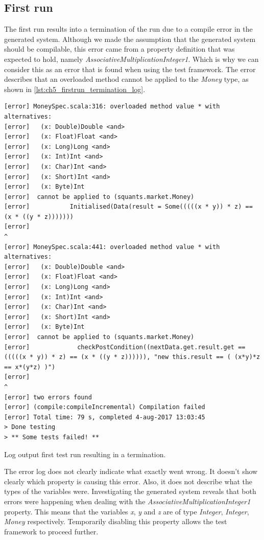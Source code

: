 \subsection{First run}
The first run results into a termination of the run due to a compile error in the generated system. Although we made the assumption that the generated system should be compilable, this error came from a property definition that was expected to hold, namely \textit{AssociativeMultiplicationInteger1}. Which is why we can consider this as an error that is found when using the test framework. The error describes that an overloaded method cannot be applied to the \textit{Money} type, as shown in \autoref{lst:ch5_firstrun_termination_log}.
\begin{sourcecode}[!ht]
\begin{lstlisting}[language=Log]
[error] MoneySpec.scala:316: overloaded method value * with alternatives:
[error]   (x: Double)Double <and>
[error]   (x: Float)Float <and>
[error]   (x: Long)Long <and>
[error]   (x: Int)Int <and>
[error]   (x: Char)Int <and>
[error]   (x: Short)Int <and>
[error]   (x: Byte)Int
[error]  cannot be applied to (squants.market.Money)
[error]           Initialised(Data(result = Some(((((x * y)) * z) == (x * ((y * z)))))))
[error]                                                                       ^
[error] MoneySpec.scala:441: overloaded method value * with alternatives:
[error]   (x: Double)Double <and>
[error]   (x: Float)Float <and>
[error]   (x: Long)Long <and>
[error]   (x: Int)Int <and>
[error]   (x: Char)Int <and>
[error]   (x: Short)Int <and>
[error]   (x: Byte)Int
[error]  cannot be applied to (squants.market.Money)
[error]             checkPostCondition((nextData.get.result.get == (((((x * y)) * z) == (x * ((y * z)))))), "new this.result == ( (x*y)*z == x*(y*z) )")
[error]                                                                                            ^
[error] two errors found
[error] (compile:compileIncremental) Compilation failed
[error] Total time: 79 s, completed 4-aug-2017 13:03:45
> Done testing
> ** Some tests failed! **
\end{lstlisting}
\caption{Log output first test run resulting in a termination.}
\label{lst:ch5_firstrun_termination_log}
\end{sourcecode}
\FloatBarrier\noindent
The error log does not clearly indicate what exactly went wrong. It doesn't
show clearly which property is causing this error. Also, it does not describe
what the types of the variables were. Investigating the generated system reveals
that both errors were happening when dealing with the
\textit{AssociativeMultiplicationInteger1} property. This means that the
variables \textit{x}, \textit{y} and \textit{z} are of type \textit{Integer},
\textit{Integer}, \textit{Money} respectively. Temporarily disabling this property allows the
test framework to proceed further.

